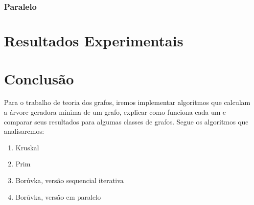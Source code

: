 \documentclass[11pt]{article}
\begin{document}
        \subsubsection{Paralelo}



\section{Resultados Experimentais}



\section{Conclusão}





Para o trabalho de teoria dos grafos, iremos implementar algoritmos que calculam a árvore geradora mínima de um grafo, explicar como funciona cada um e comparar seus resultados para algumas classes de grafos. Segue os algoritmos que analisaremos:\\
\begin{enumerate}
\item Kruskal
\item Prim
\item Borůvka, versão sequencial iterativa
\item Borůvka, versão em paralelo
\end{enumerate}
\end{document}
